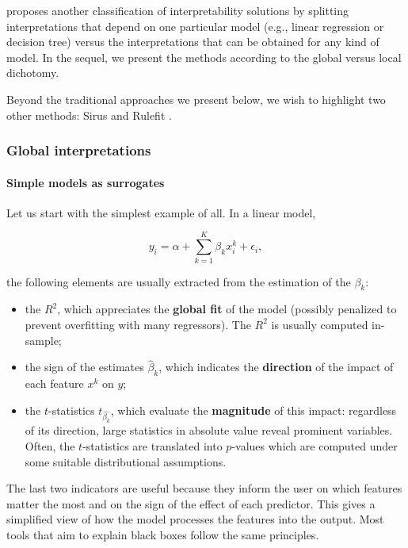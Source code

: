 \cite{molnar2019interpretable} proposes another classification of interpretability solutions by splitting interpretations that depend on one particular model (e.g., linear regression or decision tree) versus the interpretations that can be obtained for any kind of model. In the sequel, we present the methods according to the global versus local dichotomy.

Beyond the traditional approaches we present below, we wish to highlight two other methods: Sirus \citep{benard2021sirus} and Rulefit \citep{friedman2008predictive}.

\subsubsection{Global interpretations}

\paragraph{Simple models as surrogates}\label{surr}

Let us start with the simplest example of all. In a linear model,

\begin{equation}
y_i=\alpha+\sum_{k=1}^K\beta_kx_i^k+\epsilon_i,
\end{equation}

the following elements are usually extracted from the estimation of the $\beta_k$:

\begin{itemize}
\item the $R^2$, which appreciates the \textbf{global fit} of the model (possibly penalized to prevent overfitting with many regressors). The $R^2$ is usually computed in-sample;
\item the sign of the estimates $\hat{\beta}_k$, which indicates the \textbf{direction} of the impact of each feature $x^k$ on $y$;
\item the $t$-statistics $t_{\hat{\beta_k}}$, which evaluate the \textbf{magnitude} of this impact: regardless of its direction, large statistics in absolute value reveal prominent variables. Often, the $t$-statistics are translated into $p$-values which are computed under some suitable distributional assumptions.
\end{itemize}

The last two indicators are useful because they inform the user on which features matter the most and on the sign of the effect of each predictor. This gives a simplified view of how the model processes the features into the output. Most tools that aim to explain black boxes follow the same principles.

